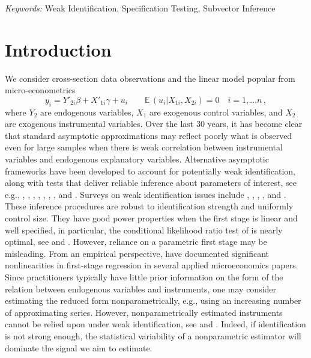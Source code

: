 \documentclass[12pt]{article}
\newcommand{\E}{\operatorname{E}}
\newcommand{\1}{\mathbf{1}}
\def\E{\mathbb{E}\,}
\begin{document}
\noindent%
{\it Keywords:} Weak Identification, Specification Testing, Subvector Inference
\vfill

\newpage
{} %


\section{Introduction}
\label{sec:intro}

We consider cross-section data observations and the linear  model popular from micro-econometrics
\begin{equation}
y_{i} = Y'_{2i} \beta + X'_{1i} \gamma +  u_{i} \qquad \E (u_{i} |
X_{1i}, X_{2i}) = 0 \quad i=1, \ldots n
\, ,
\label{eq:model}
\end{equation}
where $Y_{2}$ are endogenous variables, $X_{1}$ are exogenous control
variables, and $X_{2}$ are exogenous instrumental variables.
Over the last 30 years, it has become clear that standard asymptotic
approximations may reflect poorly what is observed even for large samples when there
is weak correlation between instrumental variables and endogenous
explanatory variables. Alternative asymptotic frameworks have
been developed to account for potentially weak identification, along with
tests that deliver reliable inference about
parameters of interest, see e.g., \cite{SS}, \cite{SW},
\cite{Moreira}, \cite{kleibergen_pivotal_2002,Kleib},
\cite{Andrews2012}, \cite{andrews_identification_2019},
\cite{Andrews2016}, and
\cite{andrews_conditional_2016,andrews_geometric_2016}.
 Surveys on weak identification issues include
\cite{SWY}, \cite{Dufour}, \cite{HH}, \cite{AS}, and
\cite{Andrews2019}.
These inference procedures are robust to identification strength and
uniformly control size. They have good power properties when the first stage is linear
and well specified, in particular,  the conditional likelihood ratio
test of \cite{Moreira} is
nearly optimal, see \cite{AMS2006} and \cite{andrews_optimal_2019}.
However,  reliance on a parametric first stage  may be misleading.
From an empirical perspective, \cite{Dieterle2016} have documented
significant nonlinearities in first-stage regression in several
applied microeconomics papers.   Since practitioners typically have little prior
information on the form of the relation between endogenous variables
and instruments, one may consider estimating the reduced form
nonparametrically, e.g., using an increasing  number of approximating
series. However,  nonparametrically estimated  instruments cannot be
relied upon under weak identification, see
\cite{JP11} and \cite{mikusheva_inference}.
Indeed, if identification is not strong enough,
the statistical variability of a nonparametric estimator will dominate
the signal we aim to estimate.
\end{document}
